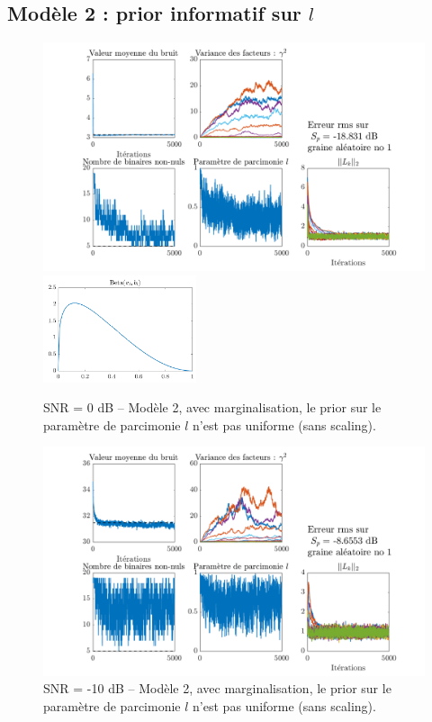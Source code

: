 \documentclass[ 12pt]{article}
\begin{document}
\subsection{Modèle 2 : prior informatif sur $l$}
\begin{figure}[H]
	\centering
	\includegraphics[width=\textwidth]{ToyCase/lsparse.png}
	\includegraphics[width=0.4\textwidth]{ToyCase/priorl.png}
	\caption{SNR = 0 dB -- Modèle 2, avec marginalisation, le prior sur le paramètre de parcimonie $l$ n'est pas uniforme (sans scaling).}
\end{figure}
\begin{figure}[H]
	\centering
	\includegraphics[width=\textwidth]{ToyCase/lsparse_snrm10db.png}
	\caption{SNR = -10 dB -- Modèle 2, avec marginalisation, le prior sur le paramètre de parcimonie $l$ n'est pas uniforme (sans scaling).}
\end{figure}
\end{document}
